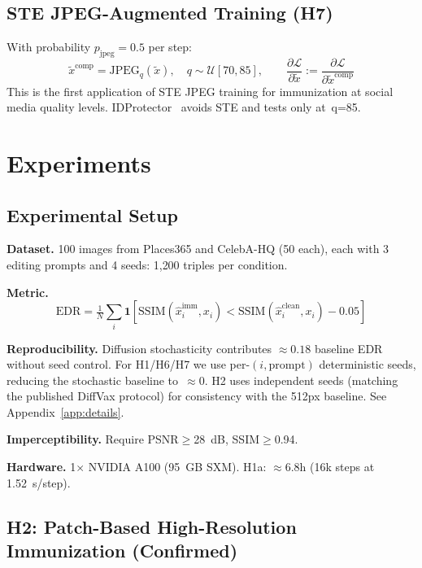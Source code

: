 \documentclass{article}
\begin{document}
\subsection{STE JPEG-Augmented Training (H7)}

With probability $p_\text{jpeg}=0.5$ per step:
\begin{equation}
\tilde{x}^{\text{comp}} = \mathrm{JPEG}_q(\tilde{x}),\quad q\sim\mathcal{U}[70,85],\qquad
\frac{\partial\mathcal{L}}{\partial\tilde{x}}:=\frac{\partial\mathcal{L}}{\partial\tilde{x}^{\text{comp}}}
\label{eq:ste}
\end{equation}
This is the first application of STE JPEG training for immunization at social media
quality levels. IDProtector~\citep{chen2024idprotector} avoids STE and tests only at~q=85.

\section{Experiments}

\subsection{Experimental Setup}

\textbf{Dataset.} 100 images from Places365 and CelebA-HQ (50 each),
each with 3 editing prompts and 4 seeds: 1{,}200 triples per condition.

\textbf{Metric.}
\begin{equation}
\text{EDR} = \tfrac{1}{N}\sum_i\mathbf{1}\!\left[\mathrm{SSIM}(\hat{x}_i^{\text{imm}},x_i)<\mathrm{SSIM}(\hat{x}_i^{\text{clean}},x_i)-0.05\right]
\end{equation}

\textbf{Reproducibility.} Diffusion stochasticity contributes ${\approx}0.18$ baseline
EDR without seed control. For H1/H6/H7 we use per-$(i,\text{prompt})$ deterministic
seeds, reducing the stochastic baseline to~${\approx}0$. H2 uses independent seeds
(matching the published DiffVax protocol) for consistency with the 512px baseline.
See Appendix~\ref{app:details}.

\textbf{Imperceptibility.} Require PSNR$\geq$28~dB, SSIM$\geq$0.94.

\textbf{Hardware.} 1$\times$ NVIDIA A100 (95~GB SXM). H1a: ${\approx}6.8$h (16k steps at 1.52~s/step).

\subsection{H2: Patch-Based High-Resolution Immunization (Confirmed)}
\end{document}
